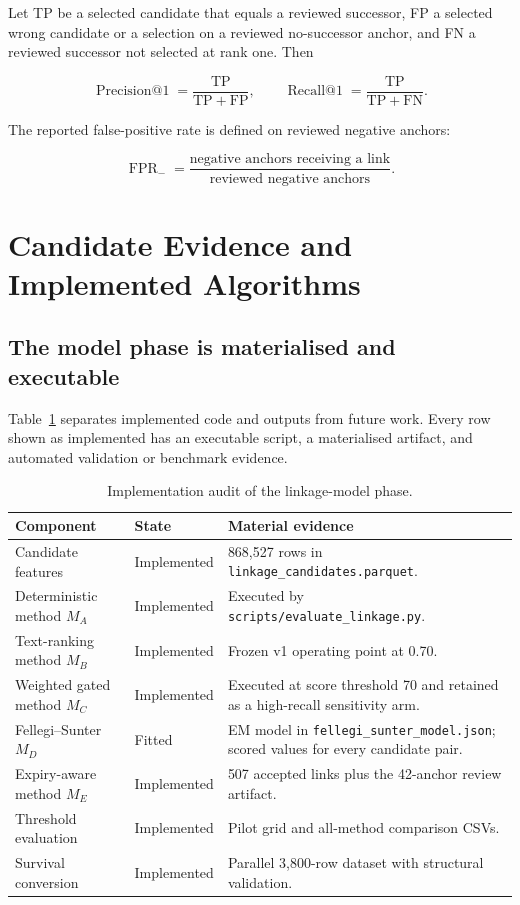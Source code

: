\documentclass[11pt,a4paper]{article}
\newcommand{\pathcode}[1]{{\small\nolinkurl{#1}}}
\begin{document}
Let TP be a selected candidate that equals a reviewed successor, FP a selected wrong
candidate or a selection on a reviewed no-successor anchor, and FN a reviewed
successor not selected at rank one. Then

\begin{equation}
  \operatorname{Precision@1}=\frac{\mathrm{TP}}{\mathrm{TP}+\mathrm{FP}},
  \qquad
  \operatorname{Recall@1}=\frac{\mathrm{TP}}{\mathrm{TP}+\mathrm{FN}}.
\end{equation}

The reported false-positive rate is defined on reviewed negative anchors:

\begin{equation}
  \operatorname{FPR}_{-}=\frac{\text{negative anchors receiving a link}}
  {\text{reviewed negative anchors}}.
\end{equation}

\section{Candidate Evidence and Implemented Algorithms}

\subsection{The model phase is materialised and executable}

Table~\ref{tab:implementation} separates implemented code and outputs from future
work. Every row shown as implemented has an executable script, a materialised
artifact, and automated validation or benchmark evidence.

\begin{table}[H]
\centering
\caption{Implementation audit of the linkage-model phase.}
\label{tab:implementation}
\small
\begin{tabularx}{\textwidth}{p{3.2cm}p{2.0cm}X}
\toprule
\textbf{Component} & \textbf{State} & \textbf{Material evidence} \\
\midrule
Candidate features & Implemented & 868,527 rows in
\pathcode{linkage_candidates.parquet}. \\
Deterministic method $M_A$ & Implemented & Executed by
\pathcode{scripts/evaluate_linkage.py}. \\
Text-ranking method $M_B$ & Implemented & Frozen v1 operating point at 0.70. \\
Weighted gated method $M_C$ & Implemented & Executed at score threshold 70 and
retained as a high-recall sensitivity arm. \\
Fellegi--Sunter $M_D$ & Fitted & EM model in
\pathcode{fellegi_sunter_model.json}; scored values for every candidate pair. \\
Expiry-aware method $M_E$ & Implemented & 507 accepted links plus the 42-anchor
review artifact. \\
Threshold evaluation & Implemented & Pilot grid and all-method comparison CSVs. \\
Survival conversion & Implemented & Parallel 3,800-row dataset with structural
validation. \\
\bottomrule
\end{tabularx}
\end{table}
\end{document}
